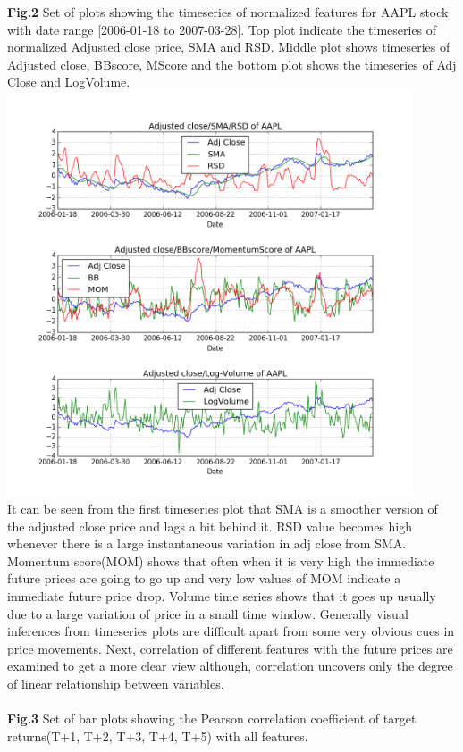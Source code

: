 \documentclass[10pt]{report}
\begin{document}
\textbf{Fig.2} Set of plots showing the timeseries of normalized features for AAPL stock with date range [2006-01-18 to 2007-03-28]. Top plot indicate the timeseries of normalized Adjusted close price, SMA and RSD. Middle plot shows timeseries of Adjusted close, BBscore, MScore and the bottom plot shows the timeseries of Adj Close and LogVolume.\\
\includegraphics[width=12cm]{plots/allplots.png}\\
It can be seen from the first timeseries plot that SMA is a smoother version of the adjusted close price and lags a bit behind it. RSD value becomes high whenever there is a large instantaneous variation in adj close from SMA. Momentum score(MOM) shows that often when it is very high the immediate future prices are going to go up and very low values of MOM indicate a immediate future price drop. Volume time series shows that it goes up usually due to a large variation of price in a small time window. Generally visual inferences from timeseries plots are difficult apart from some very obvious cues in price movements. Next, correlation of different features with the future prices are examined to get a more clear view although, correlation uncovers only the degree of linear relationship between variables.\\
\\
\textbf{Fig.3} Set of bar plots showing the Pearson correlation coefficient of target returns(T+1, T+2, T+3, T+4, T+5) with all features.\\
\end{document}
